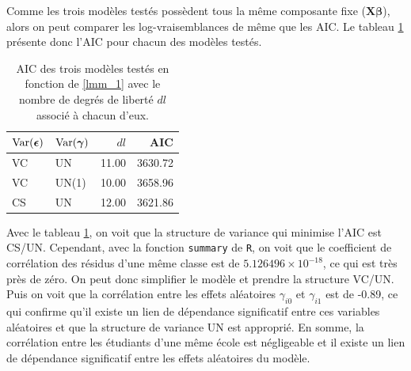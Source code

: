 \documentclass{article}
\begin{document}
		Comme les trois modèles testés possèdent tous la même composante fixe ($\boldsymbol{X\beta}$), alors on peut comparer les log-vraisemblances de même que les AIC. Le tableau \ref{tbl_AIC_Qst1a} présente donc l'AIC pour chacun des modèles testés.
		\begin{table}[H]
			\centering
			\begin{tabular}{ll|rr}
				\hline
				$\mathrm{Var}(\boldsymbol{\epsilon})$ & $\mathrm{Var}(\boldsymbol{\gamma})$ & $dl$ & AIC \\ 
				\hline
				VC & UN & 11.00 & 3630.72 \\ 
				VC & UN(1) & 10.00 & 3658.96 \\ 
				CS & UN & 12.00 & 3621.86 \\
				\hline
			\end{tabular}
		\caption{AIC des trois modèles testés en fonction de \eqref{lmm_1} avec le nombre de degrés de liberté $dl$ associé à chacun d'eux.}
		\label{tbl_AIC_Qst1a}
		\end{table}
		Avec le tableau \ref{tbl_AIC_Qst1a}, on voit que la structure de variance qui minimise l'AIC est CS/UN. Cependant, avec la fonction \texttt{summary} de \texttt{R}, on voit que le coefficient de corrélation des résidus d'une même classe est de $5.126496\times10^{-18}$, ce qui est très près de zéro. On peut donc simplifier le modèle et prendre la structure VC/UN.
		Puis on voit que la corrélation entre les effets aléatoires $\gamma_{i0}$ et $\gamma_{i1}$ est de -0.89, ce qui confirme qu'il existe un lien de dépendance significatif entre ces variables aléatoires et que la structure de variance UN est approprié.
		En somme, la corrélation entre les étudiants d'une même école est négligeable et il existe un lien de dépendance significatif entre les effets aléatoires du modèle.\\
		
\end{document}
